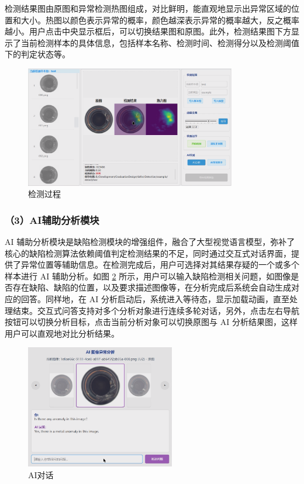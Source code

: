 \documentclass[
  ]{njuthesis}
\begin{document}
检测结果图由原图和异常检测热图组成，对比鲜明，能直观地显示出异常区域的位置和大小。热图以颜色表示异常的概率，颜色越深表示异常的概率越大，反之概率越小。用户点击中央显示框后，可以切换结果图和原图。此外，检测结果图下方显示了当前检测样本的具体信息，包括样本名称、检测时间、检测得分以及检测阈值下的判定状态等。

\begin{figure}[htb]
    \centering
    \includegraphics[width=0.82\textwidth]{images/检测过程.png}
    \caption{检测过程}
    \label{检测过程}
\end{figure}

\subsubsection{（3）AI辅助分析模块}

AI 辅助分析模块是缺陷检测模块的增强组件，融合了大型视觉语言模型，弥补了核心的缺陷检测算法依赖阈值判定检测结果的不足，同时通过交互式对话界面，提供了异常位置等辅助信息。在检测完成后，用户可选择对其结果存疑的一个或多个样本进行 AI 辅助分析。如图 \ref{AI对话} 所示，用户可以输入缺陷检测相关问题，如图像是否存在缺陷、缺陷的位置，以及要求描述图像等，在分析完成后系统会自动生成对应的回答。同样地，在 AI 分析启动后，系统进入等待态，显示加载动画，直至处理结束。交互式问答支持对多个分析对象进行连续多轮对话，另外，点击左右导航按钮可以切换分析目标，点击当前分析对象可以切换原图与 AI 分析结果图，这样用户可以直观地对比分析结果。

\begin{figure}[H]
    \centering
    \includegraphics[width=0.58\textwidth]{images/AI对话.png}
    \caption{AI对话}
    \label{AI对话}
\end{figure}
\end{document}
